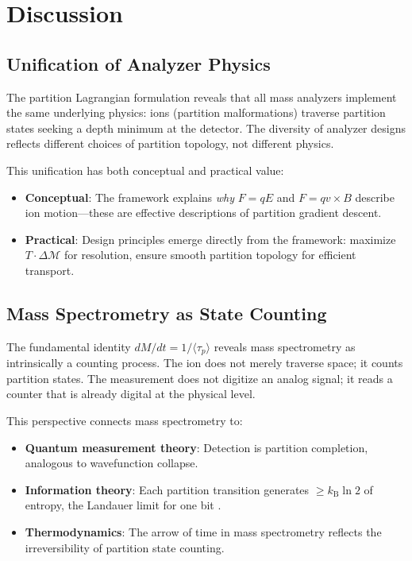 \documentclass[twocolumn,10pt,a4paper]{article}
\theoremstyle{definition}
\theoremstyle{remark}
\newcommand{\kB}{k_{\mathrm{B}}}
\newcommand{\Mdepth}{\mathcal{M}}
\newcommand{\taup}{\tau_p}
\begin{document}
\section{Discussion}
\label{sec:discussion}

\subsection{Unification of Analyzer Physics}

The partition Lagrangian formulation reveals that all mass analyzers implement the same underlying physics: ions (partition malformations) traverse partition states seeking a depth minimum at the detector. The diversity of analyzer designs reflects different choices of partition topology, not different physics.

This unification has both conceptual and practical value:
\begin{itemize}
    \item \textbf{Conceptual}: The framework explains \emph{why} $F = qE$ and $F = qv \times B$ describe ion motion---these are effective descriptions of partition gradient descent.
    \item \textbf{Practical}: Design principles emerge directly from the framework: maximize $T \cdot \Delta\Mdepth$ for resolution, ensure smooth partition topology for efficient transport.
\end{itemize}

\subsection{Mass Spectrometry as State Counting}

The fundamental identity $dM/dt = 1/\langle\taup\rangle$ reveals mass spectrometry as intrinsically a counting process. The ion does not merely traverse space; it counts partition states. The measurement does not digitize an analog signal; it reads a counter that is already digital at the physical level.

This perspective connects mass spectrometry to:
\begin{itemize}
    \item \textbf{Quantum measurement theory}: Detection is partition completion, analogous to wavefunction collapse.
    \item \textbf{Information theory}: Each partition transition generates $\geq \kB \ln 2$ of entropy, the Landauer limit for one bit \citep{landauer1961}.
    \item \textbf{Thermodynamics}: The arrow of time in mass spectrometry reflects the irreversibility of partition state counting.
\end{itemize}
\end{document}
